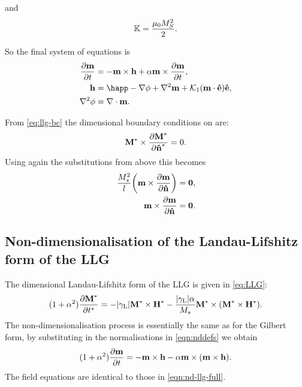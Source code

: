and
\begin{equation}
  \label{k-normalisation}
  \mathbb{K} = \frac{ \mu_0 M_S^2}{2}.
\end{equation}

So the final system of equations is
\begin{equation}
  \begin{aligned}
    \dmdt &= - \mv \times \hv + \alpha \mv \times \dmdt, \\
    \hv &= \happ - \grad \phi + \lap \mv + \kone (\mv \cdot \ev) \ev, \\
    \lap \phi &= \div \mv.
    \label{eqn:nd-llg-full}
  \end{aligned}
\end{equation}

From \cref{eq:llg-bc} the dimensional boundary conditions on are:
\begin{equation}
  \boldsymbol{\mathrm{M}}^* \times \frac{\partial \boldsymbol{\mathrm{M}}^*}{\partial \boldsymbol{\mathrm{\hat{n}}}^*} = 0.
\end{equation}
Using again the substitutions from above this becomes
\begin{equation}
  \begin{aligned}
    \frac{M_s^2}{l}{\left( \boldsymbol{\mathrm{m}} \times \frac{\partial \boldsymbol{\mathrm{m}}}{\partial \boldsymbol{\mathrm{\hat{n}}}} \right)} &= \mathbf{0}, \\
    \boldsymbol{\mathrm{m}} \times \frac{\partial \boldsymbol{\mathrm{m}}}{\partial \boldsymbol{\mathrm{\hat{n}}}} &= \mathbf{0}.
    \label{eq:103}
  \end{aligned}
\end{equation}

\subsection{Non-dimensionalisation of the Landau-Lifshitz form of the LLG}
\label{sec:land-lifsh-normalisation}

The dimensional Landau-Lifshitz form of the LLG is given in \cref{eq:LLG}:
\begin{equation}
  \label{eq:ll-nd}
  (1 + \alpha^2) \frac{\partial \boldsymbol{\mathrm{M}}^*}{\partial t^*} = - {\left|{\gamma_{\mathrm{\tiny{L}}}} \right|} \boldsymbol{\mathrm{M}}^* \times \boldsymbol{\mathrm{H}}^*
  - \frac{{\left|{\gamma_{\mathrm{\tiny{L}}}} \right|} \alpha}{M_s} \boldsymbol{\mathrm{M}}^* \times (\boldsymbol{\mathrm{M}}^* \times \boldsymbol{\mathrm{H}}^*).
\end{equation}
The non-dimensionalisation process is essentially the same as for the Gilbert form, by substituting in the normalisations in \cref{eqn:nddefs} we obtain
\begin{equation}
  (1 + \alpha^2) \frac{\partial \boldsymbol{\mathrm{m}}}{\partial t} = - \boldsymbol{\mathrm{m}} \times \boldsymbol{\mathrm{h}} - \alpha \boldsymbol{\mathrm{m}} \times (\boldsymbol{\mathrm{m}} \times \boldsymbol{\mathrm{h}}).
  \label{eq:ll-nd-llglike}
\end{equation}
The field equations are identical to those in \cref{eqn:nd-llg-full}.


